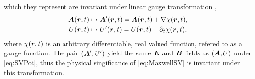 which they represent are invariant under linear gauge transformation ,
\begin{subequations}
\label{eq:GaugeFix}
\begin{align}
  \boldsymbol{A}(\boldsymbol{r}, t) &\mapsto \boldsymbol{A}'(\boldsymbol{r}, t) = \boldsymbol{A}(\boldsymbol{r},t) + \nabla \chi(\boldsymbol{r}, t), \\ 
  U(\boldsymbol{r},t) &\mapsto U'(\boldsymbol{r}, t) = U(\boldsymbol{r}, t) - \partial_t \chi(\boldsymbol{r}, t),
\end{align}
\end{subequations}
where $\chi(\boldsymbol{r},t)$ is an arbitrary differentiable, real valued function, refered to as a gauge function.
The pair $(\boldsymbol{A}', U')$ yield the same $\boldsymbol{E}$ and $\boldsymbol{B}$ fields as $(\boldsymbol{A}, U)$ under \cref{eq:SVPot},
thus the physical singificance of \cref{eq:MaxwellSV} is invariant under this transformation.

